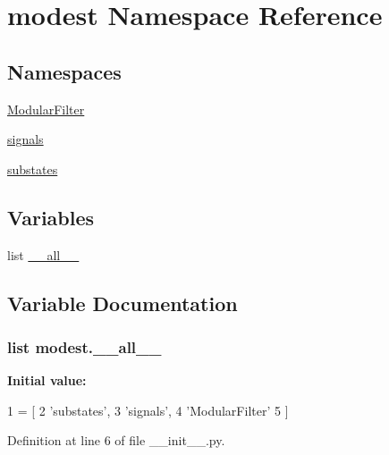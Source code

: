 \hypertarget{namespacemodest}{}\section{modest Namespace Reference}
\label{namespacemodest}
\subsection*{Namespaces}
\begin{DoxyCompactItemize}
\item 
 \hyperlink{namespacemodest_1_1ModularFilter}{Modular\+Filter}
\item 
 \hyperlink{namespacemodest_1_1signals}{signals}
\item 
 \hyperlink{namespacemodest_1_1substates}{substates}
\end{DoxyCompactItemize}
\subsection*{Variables}
\begin{DoxyCompactItemize}
\item 
list \hyperlink{namespacemodest_a8c36cd07da61d6f2919f708a59f575a7}{\+\_\+\+\_\+all\+\_\+\+\_\+}
\end{DoxyCompactItemize}


\subsection{Variable Documentation}
\subsubsection[{\texorpdfstring{\+\_\+\+\_\+all\+\_\+\+\_\+}{__all__}}]{\setlength{\rightskip}{0pt plus 5cm}list modest.\+\_\+\+\_\+all\+\_\+\+\_\+\hspace{0.3cm}{\ttfamily [private]}}\hypertarget{namespacemodest_a8c36cd07da61d6f2919f708a59f575a7}{}\label{namespacemodest_a8c36cd07da61d6f2919f708a59f575a7}
{\bfseries Initial value\+:}
\begin{DoxyCode}
1 = [
2     \textcolor{stringliteral}{'substates'},
3     \textcolor{stringliteral}{'signals'},
4     \textcolor{stringliteral}{'ModularFilter'}
5 ]
\end{DoxyCode}


Definition at line 6 of file \+\_\+\+\_\+init\+\_\+\+\_\+.\+py.

